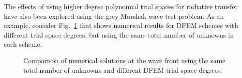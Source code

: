\documentclass[final,3p,times]{elsarticle}
\newcommand{\fig}[1]{Fig.~\ref{#1}}                      %
\begin{document}
The effects of using higher degree polynomial trial spaces for radiative transfer have also been explored using the grey Marshak wave test problem.
As an example, consider \fig{fig:ho_trt} that shows numerical results for DFEM schemes with different trial space degrees, but using the same total number of unknowns in each scheme.
\begin{figure}[!htp]
\begin{center}
\end{center}
\caption{Comparison of numerical solutions at the wave front using the same total number of unknowns and different DFEM trial space degrees.}
\label{fig:ho_trt}
\end{figure}
\end{document}

